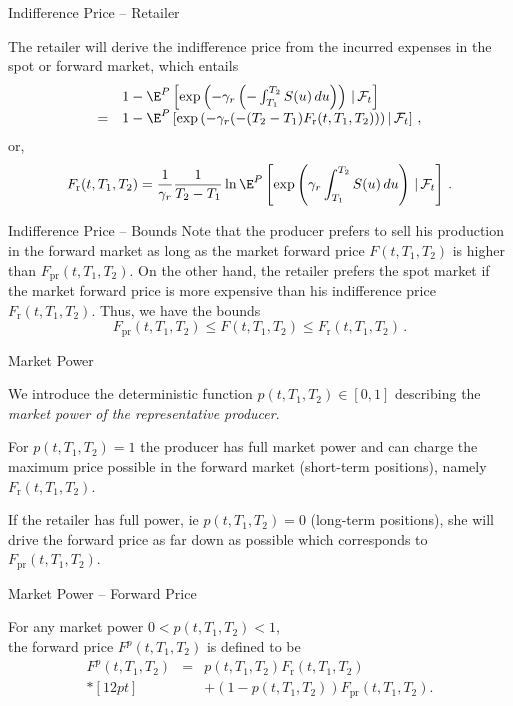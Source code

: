 {Indifference Price -- Retailer}

The retailer will derive the indifference price from the incurred expenses
in the spot or forward market, which entails
$$
\begin{array}{ll}
&1-\E^P\left[\exp\left(-\gamma_r\left(-\int_{T_1}^{T_2}S(u)\,du\right)\right)
\,|\,\mathcal{F}_t\right]\\
= &1-\E^P\left[\exp\left(-\gamma_r(-(T_2-T_1)F_{\text{r}}(t,T_1,T_2)\right))\,|\,
\mathcal{F}_t\right]\,,
\end{array}
$$
or,
\begin{equation}
F_{\text{r}}(t,T_1,T_2)=\frac1{\gamma_r}\frac1{T_2-T_1}\ln\E^P\left[
\exp\left(\gamma_r\int_{T_1}^{T_2}S(u)\,du\right)\,|\,\mathcal{F}_t\right]\,.
\end{equation}

{Indifference Price -- Bounds}
Note that the producer prefers to sell his production in the forward
market as long as the market forward price $F(t,T_1,T_2)$ is higher
than $F_{\text{pr}}(t,T_1,T_2)$. On the other hand, the retailer
prefers the spot market if the market forward price is more
expensive than his indifference price $F_{\text{r}}(t,T_1,T_2)$.
Thus, we have the bounds
\begin{equation}\label{bounds for forward}
F_{\text{pr}}(t,T_1,T_2)\leq F(t,T_1,T_2)\leq
F_{\text{r}}(t,T_1,T_2)\,.
\end{equation}

{Market Power}






	We introduce the deterministic function $p(t,T_1,T_2)\in[0,1]$
describing the \emph{market power of the representative producer}.


	For $p(t,T_1,T_2)=1$ the
producer has full market power and can charge the maximum price possible in the forward market (short-term positions),
namely $F_{\text{r}}(t,T_1,T_2)$.


	If the
retailer has full power, ie $p(t,T_1,T_2)=0$ (long-term positions), she will drive the
forward price as far down as possible which corresponds to
$F_{\text{pr}}(t,T_1,T_2)$.






{Market Power -- Forward Price}

For any market power $0<p(t,T_1,T_2)<1$,\\
the forward price $F^p(t,T_1,T_2)$ is defined to be
\begin{eqnarray}
\nonumber
F^p(t,T_1,T_2)&=&p(t,T_1,T_2)F_{\text{r}}(t,T_1,T_2)\\*[12pt]
&&+(1-p(t,T_1,T_2))
F_{\text{pr}}(t,T_1,T_2).
\end{eqnarray}

